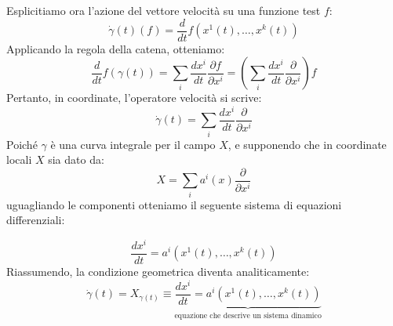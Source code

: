 \documentclass[openany]{book}
\theoremstyle{definition}
\theoremstyle{remark}
\begin{document}
\begin{center}
\end{center}
Esplicitiamo ora l'azione del vettore velocità su una funzione test $f$:
\[
\dot{\gamma}(t)(f) = \frac{d}{dt} f(x^1(t), \dots, x^k(t))
\]
Applicando la regola della catena, otteniamo:
\[
\frac{d}{dt} f(\gamma(t)) = \sum_i \frac{dx^i}{dt} \frac{\partial f}{\partial x^i} = \left( \sum_i \frac{dx^i}{dt} \frac{\partial}{\partial x^i} \right) f
\]
Pertanto, in coordinate, l'operatore velocità si scrive:
\[
\dot{\gamma}(t) = \sum_i \frac{dx^i}{dt} \frac{\partial}{\partial x^i}
\]
Poiché $\gamma$ è una curva integrale per il campo $X$, e supponendo che in coordinate locali $X$ sia dato da:
\[
X = \sum_i a^i(x) \frac{\partial}{\partial x^i}
\]
uguagliando le componenti otteniamo il seguente sistema di equazioni differenziali:

\begin{equation}
    \frac{dx^i}{dt} = a^i(x^1(t), \dots, x^k(t))
\end{equation}
Riassumendo, la condizione geometrica diventa analiticamente:
\begin{equation}
    \dot{\gamma}(t) = X_{\gamma(t)} \equiv \underbrace{\frac{dx^i}{dt} = a^i(x^1(t), \dots, x^k(t))}_{\text{equazione che descrive un sistema dinamico}}
\end{equation}
\end{document}
